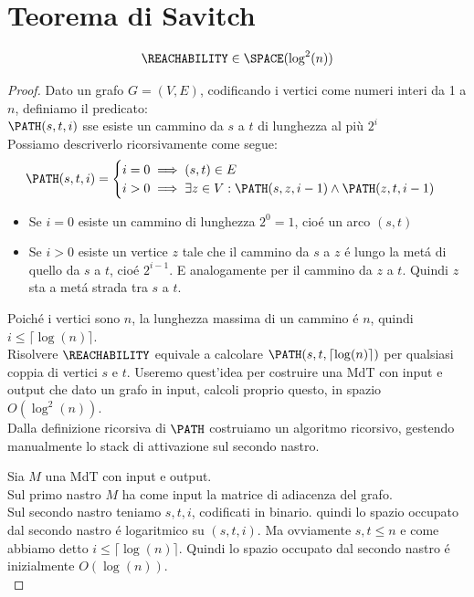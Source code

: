 \section{Teorema di Savitch}
\label{theorem:savitch}
\[
\REACHABILITY \in \SPACE(\log^2(n))
\]

\begin{proof}
Dato un grafo $G = (V, E)$, codificando i vertici come numeri interi da 1 a $n$, definiamo il predicato: \\

$\PATH(s, t, i)$ sse esiste un cammino da $s$ a $t$ di lunghezza al più $2^i$ \\

Possiamo descriverlo ricorsivamente come segue:
\[
\PATH(s, t, i) =
\begin{cases}
    i = 0 \implies (s, t) \in E \\
    i > 0 \implies \exists z \in V : \PATH(s, z, i-1) \land \PATH(z, t, i-1)
\end{cases}
\]
\begin{itemize}
    \item Se $i = 0$ esiste un cammino di lunghezza $2^0 = 1$, cioé un arco $(s,t)$
    \item Se $i > 0$ esiste un vertice $z$ tale che il cammino da $s$ a $z$ é lungo la metá di quello da $s$ a $t$, cioé $2^{i-1}$.
        E analogamente per il cammino da $z$ a $t$. Quindi $z$ sta a metá strada tra $s$ a $t$. \\
\end{itemize} 

Poiché i vertici sono $n$, la lunghezza massima di un cammino é $n$, quindi $i \leq \lceil \log(n) \rceil$. \\

Risolvere $\REACHABILITY$ equivale a calcolare 
$\PATH(s, t, \lceil \log(n) \rceil)$ per qualsiasi coppia di vertici $s$ e $t$.
Useremo quest'idea per costruire una MdT con input e output che dato un grafo in input,
calcoli proprio questo, in spazio $O(\log^2(n))$. \\ 

Dalla definizione ricorsiva di $\PATH$ costruiamo un algoritmo ricorsivo,
gestendo manualmente lo stack di attivazione sul secondo nastro.

Sia $M$ una MdT con input e output. \\
Sul primo nastro $M$ ha come input la matrice di adiacenza del grafo.\\

Sul secondo nastro teniamo $s, t, i$, codificati in binario.
quindi lo spazio occupato dal secondo nastro é logaritmico su $(s, t, i)$.
Ma ovviamente $s, t \leq n$ e come abbiamo detto $i \leq \lceil \log(n) \rceil$.
Quindi lo spazio occupato dal secondo nastro é inizialmente $O(\log(n))$. \\


\end{proof}
